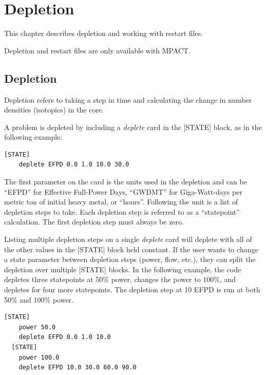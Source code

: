 %
%
\section{Depletion}  \label{chap:depletion}

This chapter describes depletion and working with restart files.

Depletion and restart files are only available with MPACT.

\subsection{Depletion}

Depletion refers to taking a step in time and calculating the change in number densities (isotopics) in the core.

A problem is depleted by including a {\it deplete} card in the [STATE] block,
as in the following example:
\begin{Verbatim}[fontsize=\small]
  [STATE]
    deplete EFPD 0.0 1.0 10.0 30.0
\end{Verbatim}
The first parameter on the card is the units used in the depletion and can be ``EFPD'' for Effective Full-Power Days,
``GWDMT'' for Giga-Watt-days per metric ton of initial heavy metal, or ``hours''.
Following the unit is a list of depletion steps to take.
Each depletion step is referred to as a ``statepoint'' calculation.
The first depletion step must always be zero.

Listing multiple depletion steps on a single {\it deplete} card will deplete with all of the other
values in the [STATE] block held constant.  If the user wants to change a state parameter between
depletion steps (power, flow, etc.), they can split the depletion over multiple [STATE] blocks.
In the following example, the code depletes three statepoints at 50\% power, changes the power
to 100\%, and depletes for four more statepoints.
The depletion step at 10 EFPD is run at both 50\% and 100\% power.
\begin{Verbatim}[fontsize=\small]
  [STATE]
    power 50.0
    deplete EFPD 0.0 1.0 10.0
  [STATE]
    power 100.0
    deplete EFPD 10.0 30.0 60.0 90.0
\end{Verbatim}

